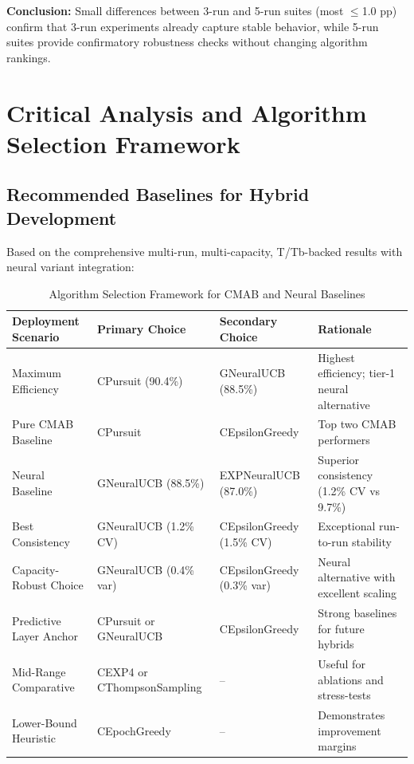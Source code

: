 \documentclass[12pt,a4paper]{article}
\begin{document}
\textbf{Conclusion:} Small differences between 3-run and 5-run suites (most $\leq$1.0 pp) confirm that 3-run experiments already capture stable behavior, while 5-run suites provide confirmatory robustness checks without changing algorithm rankings.

\newpage
\section{Critical Analysis and Algorithm Selection Framework}

\subsection{Recommended Baselines for Hybrid Development}

Based on the comprehensive multi-run, multi-capacity, T/Tb-backed results with neural variant integration:

\begin{table}[H]
\scriptsize
\centering
\caption{Algorithm Selection Framework for CMAB and Neural Baselines}
\begin{tabular}{|l|l|l|l|}
\hline
\textbf{Deployment Scenario} & \textbf{Primary Choice} & \textbf{Secondary Choice} & \textbf{Rationale} \\
\hline
\hline
Maximum Efficiency & CPursuit (90.4\%) & GNeuralUCB (88.5\%) & Highest efficiency; tier-1 neural alternative \\
Pure CMAB Baseline & CPursuit & CEpsilonGreedy & Top two CMAB performers \\
Neural Baseline & GNeuralUCB (88.5\%) & EXPNeuralUCB (87.0\%) & Superior consistency (1.2\% CV vs 9.7\%) \\
Best Consistency & GNeuralUCB (1.2\% CV) & CEpsilonGreedy (1.5\% CV) & Exceptional run-to-run stability \\
Capacity-Robust Choice & GNeuralUCB (0.4\% var) & CEpsilonGreedy (0.3\% var) & Neural alternative with excellent scaling \\
Predictive Layer Anchor & CPursuit or GNeuralUCB & CEpsilonGreedy & Strong baselines for future hybrids \\
Mid-Range Comparative & CEXP4 or CThompsonSampling & --           & Useful for ablations and stress-tests \\
Lower-Bound Heuristic & CEpochGreedy & --           & Demonstrates improvement margins \\
\hline
\end{tabular}
\end{table}
\end{document}

